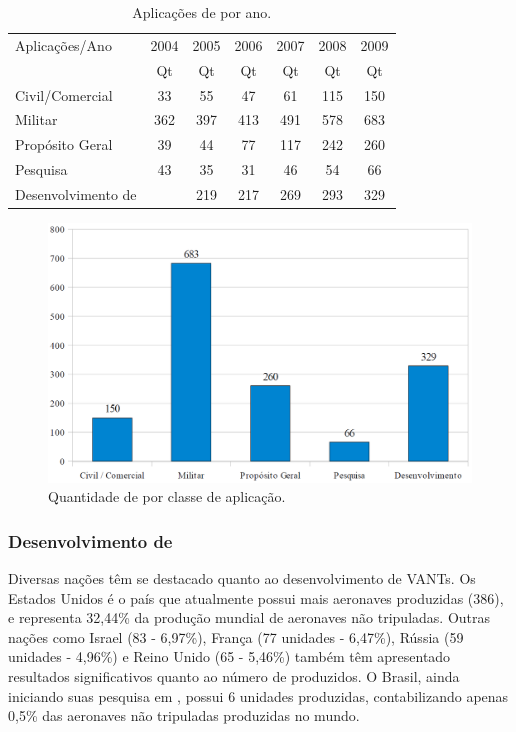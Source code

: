 \begin{table}[h!]
\centering
	\begin{tabular}{| l | c | c | c | c | c | c |}
		\hline
		Aplicações/Ano & 2004 & 2005 & 2006 & 2007 & 2008 & 2009 \\
		\cline{2-7}
		 & Qt & Qt & Qt & Qt & Qt & Qt  \\
		\hline
		Civil/Comercial  & 33 &  55  & 47  & 61  & 115  & 150 \\
		Militar  & 362  & 397  & 413  & 491  & 578  & 683 \\
		Propósito Geral &  39  & 44  & 77  & 117  & 242  & 260 \\
		Pesquisa  & 43  & 35  & 31  & 46  & 54  & 66 \\
		Desenvolvimento de \vants &   & 219  & 217  & 269  & 293  & 329 \\
		\hline
	\end{tabular}

	\caption{Aplicações de \vants por ano.}
	\label{tbl:vants_por_ano}
\end{table}



\begin{figure}[h!]
\centering
\includegraphics[width=13cm]{pictures/qt_uavs_app.png}
\caption{Quantidade de \vants por classe de aplicação. }
 \label{fig:qt_uav_app}
\end{figure}



\subsubsection{Desenvolvimento de \vants}

Diversas nações têm se destacado quanto ao desenvolvimento de VANTs. Os Estados Unidos é o país que atualmente possui mais aeronaves produzidas (386), e representa 32,44\% da
produção mundial de aeronaves não tripuladas. Outras nações como Israel (83 - 6,97\%),  França (77 unidades - 6,47\%), Rússia (59 unidades - 4,96\%) e Reino Unido (65 - 5,46\%) também têm apresentado resultados significativos quanto ao número de \vants produzidos. O Brasil, ainda iniciando suas pesquisa em \vants, possui 6 unidades produzidas, contabilizando apenas 0,5\% das aeronaves não tripuladas produzidas no mundo.


